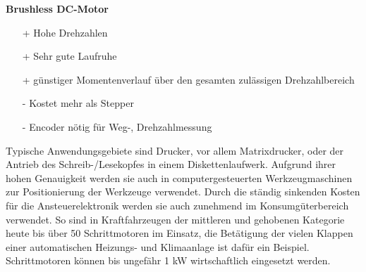 \begin{description}[leftmargin=3cm]
\begin{minipage}[t]{0.38\textwidth}
\begin{itemize}
								\end{itemize}
							\end{minipage}
							\hspace{0.5cm}
							\begin{minipage}[t]{0.35\textwidth}
								\textbf{Brushless DC-Motor}
								\begin{itemize}
									\item[+] Hohe Drehzahlen
									\item[+] Sehr gute Laufruhe
									\item[+] günstiger Momentenverlauf über den gesamten zulässigen Drehzahlbereich
									\item[-] Kostet mehr als Stepper
									\item[-] Encoder nötig für Weg-, Drehzahlmessung
								\end{itemize}
							\end{minipage}	
						
							\item[Anwendungszwecke]
							Typische Anwendungsgebiete sind Drucker, vor allem Matrixdrucker, oder der Antrieb des Schreib-/Lesekopfes in einem Diskettenlaufwerk. Aufgrund ihrer hohen Genauigkeit werden sie auch in computergesteuerten Werkzeugmaschinen zur Positionierung der Werkzeuge verwendet. Durch die ständig sinkenden Kosten für die Ansteuerelektronik werden sie auch zunehmend im Konsumgüterbereich verwendet. So sind in Kraftfahrzeugen der mittleren und gehobenen Kategorie heute bis über 50 Schrittmotoren im Einsatz, die Betätigung der vielen Klappen einer automatischen Heizungs- und Klimaanlage ist dafür ein Beispiel. Schrittmotoren können bis ungefähr 1 kW wirtschaftlich eingesetzt werden.
																		
						\end{description}
						
